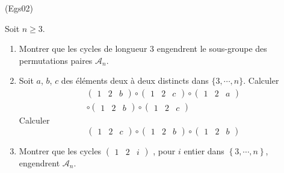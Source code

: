 \begin{tiny}(Egs02)\end{tiny}
Soit $n\geq 3$.
\begin{enumerate}
 \item Montrer que les cycles de longueur $3$ engendrent le sous-groupe des permutations paires $\mathcal{A}_{n}$.
 \item Soit $a$, $b$, $c$ des éléments deux à deux distincts dans $\{3,\cdots,n\}$. Calculer
\begin{multline*}
 \begin{pmatrix}
  1&2&b
 \end{pmatrix}
\circ
 \begin{pmatrix}
  1&2&c
 \end{pmatrix}
\circ
 \begin{pmatrix}
  1&2&a
 \end{pmatrix} \\
\circ
 \begin{pmatrix}
  1&2&b
 \end{pmatrix}
\circ
 \begin{pmatrix}
  1&2&c
 \end{pmatrix}
\end{multline*}
Calculer
\begin{displaymath}
 \begin{pmatrix}
  1&2&c
 \end{pmatrix}
\circ
 \begin{pmatrix}
  1&2&b
 \end{pmatrix}
\circ
 \begin{pmatrix}
  1&2&b
 \end{pmatrix}
\end{displaymath}
\item  Montrer que les cycles
$\begin{pmatrix}
  1&2&i
 \end{pmatrix}
$
, pour $i$ entier dans $\left\{3,\cdots ,n\right\}$, engendrent $\mathcal{A}_{n}$. 
\end{enumerate}
